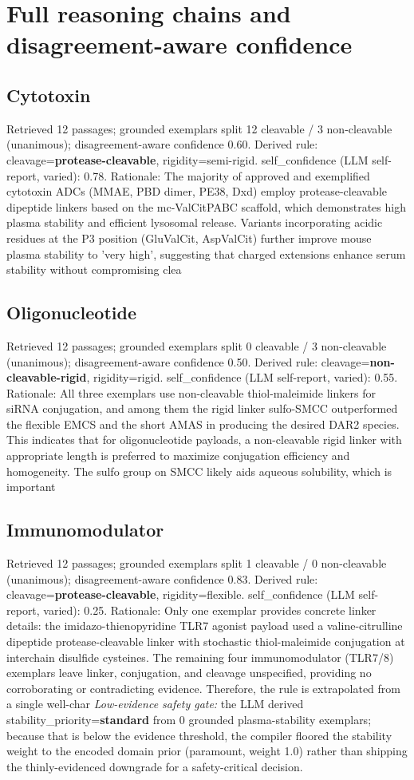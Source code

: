\documentclass[10pt]{article}
\begin{document}
\section{Full reasoning chains and disagreement-aware confidence}
\subsection{Cytotoxin}
Retrieved 12 passages; grounded exemplars split 12 cleavable / 3 non-cleavable (unanimous); disagreement-aware confidence 0.60. Derived rule: cleavage=\textbf{protease-cleavable}, rigidity=semi-rigid. self\_confidence (LLM self-report, varied): 0.78. Rationale: The majority of approved and exemplified cytotoxin ADCs (MMAE, PBD dimer, PE38, Dxd) employ protease-cleavable dipeptide linkers based on the mc-ValCitPABC scaffold, which demonstrates high plasma stability and efficient lysosomal release. Variants incorporating acidic residues at the P3 position (GluValCit, AspValCit) further improve mouse plasma stability to 'very high', suggesting that charged extensions enhance serum stability without compromising clea
\subsection{Oligonucleotide}
Retrieved 12 passages; grounded exemplars split 0 cleavable / 3 non-cleavable (unanimous); disagreement-aware confidence 0.50. Derived rule: cleavage=\textbf{non-cleavable-rigid}, rigidity=rigid. self\_confidence (LLM self-report, varied): 0.55. Rationale: All three exemplars use non-cleavable thiol-maleimide linkers for siRNA conjugation, and among them the rigid linker sulfo-SMCC outperformed the flexible EMCS and the short AMAS in producing the desired DAR2 species. This indicates that for oligonucleotide payloads, a non-cleavable rigid linker with appropriate length is preferred to maximize conjugation efficiency and homogeneity. The sulfo group on SMCC likely aids aqueous solubility, which is important 
\subsection{Immunomodulator}
Retrieved 12 passages; grounded exemplars split 1 cleavable / 0 non-cleavable (unanimous); disagreement-aware confidence 0.83. Derived rule: cleavage=\textbf{protease-cleavable}, rigidity=flexible. self\_confidence (LLM self-report, varied): 0.25. Rationale: Only one exemplar provides concrete linker details: the imidazo-thienopyridine TLR7 agonist payload used a valine-citrulline dipeptide protease-cleavable linker with stochastic thiol-maleimide conjugation at interchain disulfide cysteines. The remaining four immunomodulator (TLR7/8) exemplars leave linker, conjugation, and cleavage unspecified, providing no corroborating or contradicting evidence. Therefore, the rule is extrapolated from a single well-char \emph{Low-evidence safety gate:} the LLM derived stability\_priority=\textbf{standard} from 0 grounded plasma-stability exemplars; because that is below the evidence threshold, the compiler floored the stability weight to the encoded domain prior (paramount, weight 1.0) rather than shipping the thinly-evidenced downgrade for a safety-critical decision.
\end{document}
